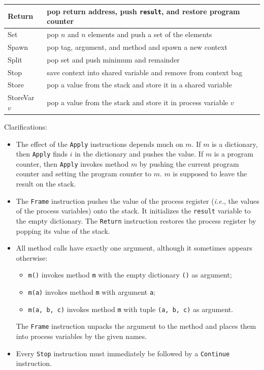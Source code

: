 \documentclass{report}
\begin{document}
\begin{tabular}{|l|l|}
\hline
Return & pop return address, push \texttt{result}, and restore program counter \\
\hline
Set & pop $n$ and $n$ elements and push a set of the elements \\
\hline
Spawn & pop tag, argument, and method and spawn a new context \\
\hline
Split & pop set and push minimum and remainder \\
\hline
Stop & save context into shared variable and remove from context bag \\
\hline
Store & pop a value from the stack and store it in a shared variable \\
\hline
StoreVar $v$ & pop a value from the stack and store it in process variable $v$ \\
\hline
\end{tabular}
\vspace{1em}

Clarifications:
\begin{itemize}
\item The effect of the \texttt{Apply} instructions depends much on $m$.
If $m$ is a dictionary, then \texttt{Apply} finds $i$ in the dictionary
and pushes the value.
If $m$ is a program counter, then \texttt{Apply} invokes method $m$ by
pushing the current program counter and setting the program counter to
$m$.  $m$ is supposed to leave the result on the stack.
\item The \texttt{Frame} instruction pushes the value of the process
register (\emph{i.e.}, the values of the process variables) onto the
stack.  It initializes the \texttt{result} variable to the empty dictionary.
The \texttt{Return} instruction restores the process register by popping
its value of the stack.
\item All method calls have exactly one argument, although it sometimes
appears otherwise:
\begin{itemize}
\item \texttt{m()} invokes method \texttt{m} with the empty dictionary \texttt{()} as argument;
\item \texttt{m(a)} invokes method \texttt{m} with argument \texttt{a};
\item \texttt{m(a, b, c)} invokes method \texttt{m} with tuple \texttt{(a, b, c)} as argument.
\end{itemize}
The \texttt{Frame} instruction unpacks the argument to the method and places them into process variables by the given names.
\item Every \texttt{Stop} instruction must immediately be followed by a 
\texttt{Continue} instruction.
\end{itemize}
\end{document}
